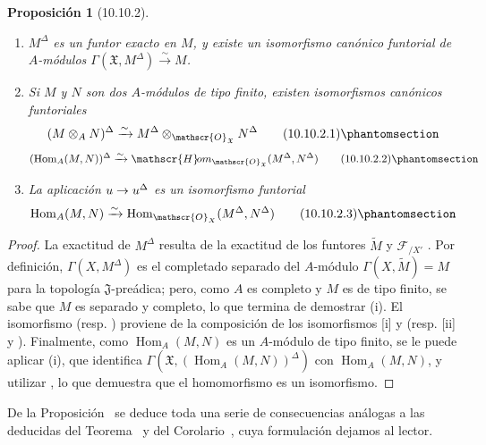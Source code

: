 \documentclass[oneside]{amsart}
\theoremstyle{ega-env-style}
\theoremstyle{ega-thm-env-style}
\newtheorem*{proposition}{Proposición}
\theoremstyle{ega-defn-env-style}
\renewcommand{\to}{\mathchoice{\longrightarrow}{\rightarrow}{\rightarrow}{\rightarrow}}
\let\EGAOriginalLabel\label
\renewcommand{\label}[1]{\phantomsection\EGAOriginalLabel{#1}}
\begin{document}
\begin{proposition}[10.10.2]
\label{I.10.10.2}
\medskip\noindent
\begin{enumerate}
  \item[\rm{(i)}] $M^\Delta$ es un funtor exacto en $M$, y existe un isomorfismo canónico funtorial de $A$-módulos $\Gamma(\mathfrak{X},M^\Delta)\xrightarrow{\sim}M$.
  \item[\rm{(ii)}] Si $M$ y $N$ son dos $A$-módulos de tipo finito, existen isomorfismos canónicos funtoriales
    \[
      (M\otimes_A N)^\Delta
      \xrightarrow{\sim}
      M^\Delta\otimes_{\mathscr{O}_{\mathfrak{X}}}N^\Delta
      \tag{10.10.2.1}\label{I.10.10.2.1-fr}
    \]
    \[
      (\operatorname{Hom}_A(M,N))^\Delta
      \xrightarrow{\sim}
      \mathscr{H}\!om_{\mathscr{O}_{\mathfrak{X}}}
      (M^\Delta,N^\Delta)
      \tag{10.10.2.2}\label{I.10.10.2.2-fr}
    \]
  \item[\rm{(iii)}] La aplicación $u\to u^\Delta$ es un isomorfismo funtorial
    \[
      \operatorname{Hom}_A(M,N)
      \xrightarrow{\sim}
      \operatorname{Hom}_{\mathscr{O}_X}
      (M^\Delta,N^\Delta)
      \tag{10.10.2.3}\label{I.10.10.2.3-fr}
    \]
\end{enumerate}
\end{proposition}

\begin{proof}
La exactitud de $M^\Delta$ resulta de la exactitud de los funtores $\widetilde M$  y $\mathscr{F}_{/X'}$ .
Por definición, $\Gamma(X,M^\Delta)$ es el completado separado del $A$-módulo $\Gamma(X,\widetilde M)=M$ para la topología $\mathfrak{J}$-preádica; pero, como $A$ es completo y $M$ es de tipo finito, se sabe  que $M$ es separado y completo, lo que termina de demostrar (i).
El isomorfismo  (resp. ) proviene de la composición de los isomorfismos [i] y  (resp. [ii] y ).
Finalmente, como $\operatorname{Hom}_A(M,N)$ es un $A$-módulo de tipo finito, se le puede aplicar (i), que identifica $\Gamma(\mathfrak{X},(\operatorname{Hom}_A(M,N))^\Delta)$ con $\operatorname{Hom}_A(M,N)$, y utilizar , lo que demuestra que el homomorfismo  es un isomorfismo.
\end{proof}

De la Proposición~ se deduce toda una serie de consecuencias análogas a las deducidas del Teorema~ y del Corolario~, cuya formulación dejamos al lector.
\end{document}
